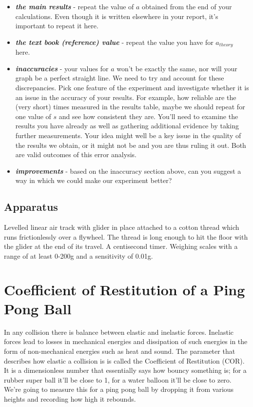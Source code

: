\documentclass[
  letterpaper,
  DIV=11,
  numbers=noendperiod]{scrreprt}
\begin{document}
\begin{itemize}
\item
  \textbf{\emph{the main results}} - repeat the value of \(a\) obtained
  from the end of your calculations. Even though it is written elsewhere
  in your report, it's important to repeat it here.
\item
  \textbf{\emph{the text book (reference) value}} - repeat the value you
  have for \(a_{theory}\) here.
\item
  \textbf{\emph{inaccuracies}} - your values for \(a\) won't be exactly
  the same, nor will your graph be a perfect straight line. We need to
  try and account for these discrepancies. Pick one feature of the
  experiment and investigate whether it is an issue in the accuracy of
  your results. For example, how reliable are the (very short) times
  measured in the results table, maybe we should repeat for one value of
  \(s\) and see how consistent they are. You'll need to examine the
  results you have already as well as gathering additional evidence by
  taking further measurements. Your idea might well be a key issue in
  the quality of the results we obtain, or it might not be and you are
  thus ruling it out. Both are valid outcomes of this error analysis.
\item
  \textbf{\emph{improvements}} - based on the inaccuracy section above,
  can you suggest a way in which we could make our experiment better?
\end{itemize}

\section{Apparatus}\label{apparatus-5}

Levelled linear air track with glider in place attached to a cotton
thread which runs frictionlessly over a flywheel. The thread is long
enough to hit the floor with the glider at the end of its travel. A
centisecond timer. Weighing scales with a range of at least 0-200g and a
sensitivity of 0.01g.


\chapter{Coefficient of Restitution of a Ping Pong
Ball}\label{coefficient-of-restitution-of-a-ping-pong-ball}

In any collision there is balance between elastic and inelastic forces.
Inelastic forces lead to losses in mechanical energies and dissipation
of such energies in the form of non-mechanical energies such as heat and
sound. The parameter that describes how elastic a collision is is called
the Coefficient of Restitution (COR). It is a dimensionless number that
essentially says how bouncy something is; for a rubber super ball it'll
be close to 1, for a water balloon it'll be close to zero. We're going
to measure this for a ping pong ball by dropping it from various heights
and recording how high it rebounds.
\end{document}
